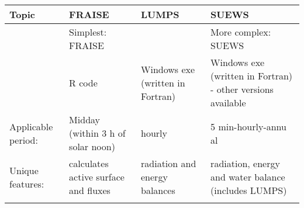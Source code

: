 \documentclass[letterpaper,10pt,english]{sphinxmanual}
\begin{document}
\begin{savenotes}\sphinxattablestart
\centering
\begin{tabulary}{\linewidth}[t]{|T|T|T|T|}
\hline
\sphinxstyletheadfamily 
Topic
&\sphinxstyletheadfamily 
FRAISE
&\sphinxstyletheadfamily 
LUMPS
&\sphinxstyletheadfamily 
SUEWS
\\
\hline
{}
&
Simplest:
FRAISE
&&
More complex:
SUEWS
\\
\hline
{}
&
R code
&
Windows exe
(written in
Fortran)
&
Windows exe
(written in
Fortran) -
other versions
available
\\
\hline
Applicable
period:
&
Midday (within
3 h of solar
noon)
&
hourly
&
5
min-hourly-annu
al
\\
\hline
Unique
features:
&
calculates
active surface
\textendash{} and fluxes
&
radiation and
energy balances
&
radiation,
energy and
water balance
(includes
LUMPS)
\\
\hline&&&\\
\hline
\end{tabulary}
\par
\sphinxattableend\end{savenotes}
\end{document}
